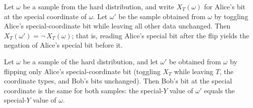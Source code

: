 \begin{theorem}
\label{CommunicationComplexity.Functions.Disjointness.RandomizedLowerBound.specialX_flipSpecialX}
\leanok
{}
Let $\omega$ be a sample from the hard distribution, and write $X_T(\omega)$ for Alice's
bit at the special coordinate of $\omega$. Let $\omega'$ be the sample obtained from
$\omega$ by toggling Alice's special-coordinate bit while leaving all other data
unchanged. Then $X_T(\omega') = \lnot\, X_T(\omega)$; that is, reading Alice's special
bit after the flip yields the negation of Alice's special bit before it.
\end{theorem}

\begin{theorem}
\label{CommunicationComplexity.Functions.Disjointness.RandomizedLowerBound.specialY_flipSpecialX}
\leanok
{}
Let $\omega$ be a sample of the hard distribution, and let $\omega'$ be obtained from
$\omega$ by flipping only Alice's special-coordinate bit (toggling $X_T$ while leaving
$T$, the coordinate types, and Bob's bits unchanged). Then Bob's bit at the special
coordinate is the same for both samples: the special-$Y$ value of $\omega'$ equals the
special-$Y$ value of $\omega$.
\end{theorem}

